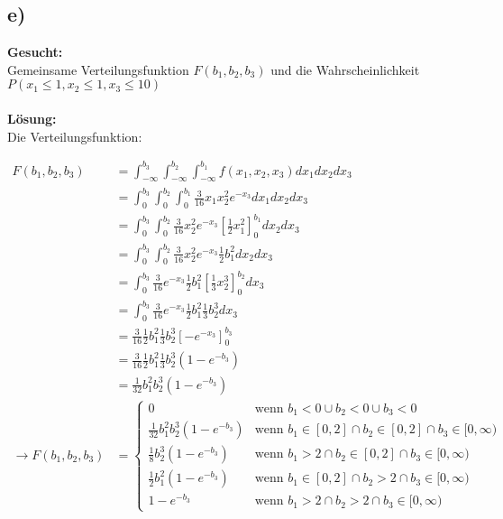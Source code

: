 \documentclass{article}
\begin{document}
\subsection*{e)}
\textbf{Gesucht:} \\

Gemeinsame Verteilungsfunktion $F(b_1, b_2, b_3)$ und die Wahrscheinlichkeit $P(x_1 \leq 1, x_2 \leq 1, x_3 \leq 10)$ \\  \\
\textbf{Lösung:} \\

Die Verteilungsfunktion: 

\begin{align*}
    F(b_1, b_2, b_3) &= \int_{-\infty}^{b_3}\int_{-\infty}^{b_2}\int_{-\infty}^{b_1} f(x_1, x_2, x_3) dx_1 dx_2 dx_3 \\
    &=   \int_{0}^{b_3}\int_{0}^{b_2}\int_{0}^{b_1} \frac{3}{16} x_1x_2^2e^{-x_3} dx_1dx_2dx_3 \\
    &= \int_{0}^{b_3}\int_{0}^{b_2} \frac{3}{16}x_2^2e^{-x_3}\left[\frac{1}{2} x_1^2\right]^{b_1}_0 dx_2 dx_3 \\
    &= \int_{0}^{b_3}\int_{0}^{b_2} \frac{3}{16}x_2^2e^{-x_3} \frac{1}{2} b_1^2 dx_2 dx_3 \\
    &= \int_{0}^{b_3}\frac{3}{16}e^{-x_3} \frac{1}{2}b_1^2 \left[\frac{1}{3}x_2^3\right]_0^{b_2} dx_3 \\
    &= \int_{0}^{b_3}\frac{3}{16}e^{-x_3} \frac{1}{2}b_1^2 \frac{1}{3} b_2^3 dx_3 \\
    &= \frac{3}{16}\frac{1}{2}b_1^2 \frac{1}{3} b_2^3 \left[-e^{-x_3}\right]_0^{b_3} \\
    &= \frac{3}{16}\frac{1}{2}b_1^2 \frac{1}{3} b_2^3 (1 - e^{-b_3}) \\
    &= \frac{1}{32}b_1^2 b_2^3(1- e^{-b_3})\\
    \longrightarrow F(b_1, b_2, b_3) &= \begin{cases}
        0 &\text{wenn } b_1 < 0 \cup b_2 < 0 \cup b_3 < 0 \\
        \frac{1}{32}b_1^2 b_2^3(1- e^{-b_3}) &\text{wenn } b_1 \in [0,2] \cap b_2 \in [0,2] \cap b_3 \in [0,\infty) \\
        \frac{1}{8}b_2^3(1- e^{-b_3}) &\text{wenn } b_1 > 2 \cap b_2 \in [0,2] \cap b_3 \in [0,\infty) \\
        \frac{1}{2}b_1^2(1- e^{-b_3}) &\text{wenn } b_1 \in [0,2] \cap b_2 > 2 \cap b_3 \in [0,\infty) \\
        1- e^{-b_3} &\text{wenn } b_1 > 2 \cap b_2 > 2 \cap b_3 \in [0,\infty)
    \end{cases}
\end{align*}
\end{document}
